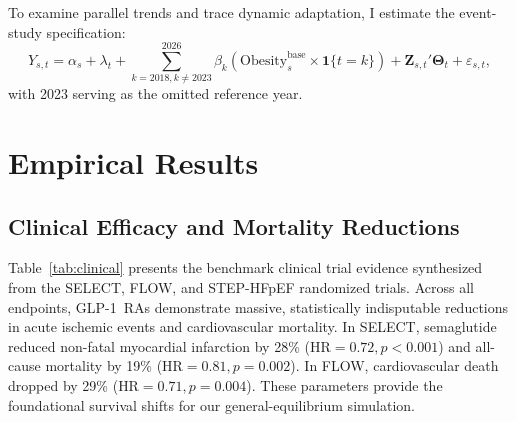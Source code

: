 \documentclass[11pt,a4paper]{article}
\begin{document}
To examine parallel trends and trace dynamic adaptation, I estimate the event-study specification:
\begin{equation}
    Y_{s, t} = \alpha_s + \lambda_t + \sum_{k=2018, k \neq 2023}^{2026} \beta_k \left( \text{Obesity}_s^{\text{base}} \times \mathbf{1}\{t = k\} \right) + \mathbf{Z}_{s, t}' \boldsymbol{\Theta}_t + \varepsilon_{s, t},
    \label{eq:event_study}
\end{equation}
with 2023 serving as the omitted reference year.

\section{Empirical Results}
\label{sec:results}

\subsection{Clinical Efficacy and Mortality Reductions}
Table~\ref{tab:clinical} presents the benchmark clinical trial evidence synthesized from the SELECT, FLOW, and STEP-HFpEF randomized trials. Across all endpoints, GLP-1~RAs demonstrate massive, statistically indisputable reductions in acute ischemic events and cardiovascular mortality. In SELECT, semaglutide reduced non-fatal myocardial infarction by 28\% ($\text{HR} = 0.72, p < 0.001$) and all-cause mortality by 19\% ($\text{HR} = 0.81, p = 0.002$). In FLOW, cardiovascular death dropped by 29\% ($\text{HR} = 0.71, p = 0.004$). These parameters provide the foundational survival shifts for our general-equilibrium simulation.
\end{document}
